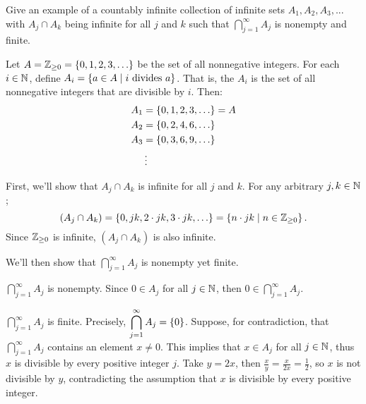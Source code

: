 \begin{problem}
  Give an example of a countably infinite collection of infinite sets
  $A_1, A_2, A_3, ...$ with $A_j \cap A_k$ being infinite for all
  $j$ and $k$ such that $\displaystyle \bigcap_{j=1}^\infty A_j$ is nonempty
  and finite.
\end{problem}
\begin{answer}
  Let $A = \mathbb{Z}_{\geq 0} = \left\{0, 1, 2, 3, \ldots\right\}$ be the set of all nonnegative integers.
  For each $i \in \mathbb{N}$, define $A_i = \left\{a \in A \mid i \text{ divides } a\right\}$.
  That is, the $A_i$ is the set of all nonnegative integers that are divisible by $i$. 
  Then:
  \begin{align*}
    A_1 &= \left\{0, 1, 2, 3, \ldots\right\} = A \\
    A_2 &= \left\{0, 2, 4, 6, \ldots\right\} \\
    A_3 &= \left\{0, 3, 6, 9, \ldots\right\} \\
    &\vdots
  \end{align*}
  \begin{enumroman}
    \item First, we'll show that $A_j \cap A_k$ is infinite for all $j$ and $k$.
      For any arbitrary $j, k \in \mathbb{N}$;
      \[
        (A_j \cap A_k) = \left\{0, jk , 2 \cdot jk, 3 \cdot jk, \ldots\right\} = \left\{ n \cdot jk \mid n \in \mathbb{Z}_{\geq 0}\right\}.
      \]
      Since $\mathbb{Z}_{\geq 0}$ is infinite, $(A_j \cap A_k)$ is also infinite. \\
    \item We'll then show that $\displaystyle \bigcap_{j=1}^\infty A_j$ is nonempty yet finite.
      \begin{enumarabic}
        \item $\displaystyle \bigcap_{j=1}^\infty A_j$ is nonempty.
          Since $0 \in A_j$ for all $j \in \mathbb{N}$, then $0 \in \displaystyle \bigcap_{j=1}^\infty A_j$. \\
        \item $\displaystyle \bigcap_{j=1}^\infty A_j$ is finite.
          Precisely, $\displaystyle \bigcap_{j=1}^\infty A_j = \left\{0\right\}$.
          Suppose, for contradiction, that $\displaystyle \bigcap_{j=1}^\infty A_j$
          contains an element $x \neq 0$.
          This implies that $x \in A_j$ for all $j \in \mathbb{N}$,
          thus $x$ is divisible by every positive integer $j$.
          Take $y = 2x$, then $\displaystyle \frac{x}{y} = \frac{x}{2x} = \frac{1}{2}$,
          so $x$ is not divisible by $y$, contradicting the assumption that $x$
          is divisible by every positive integer.
      \end{enumarabic}

\end{enumroman}
\end{answer}
